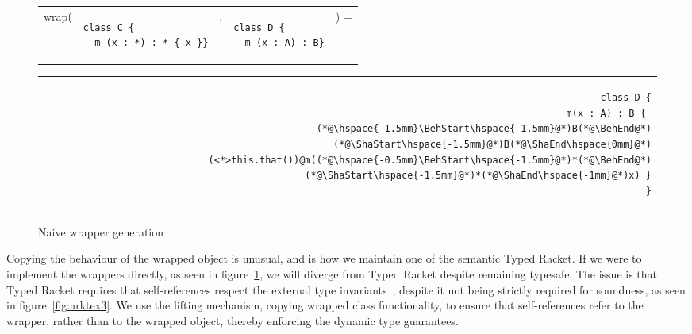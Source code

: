 \documentclass[a4paper,USenglish]{tex/lipics-v2016}
\begin{document}
\begin{figure}[!ht]
\begin{tabular}{ER{4.5cm}ER{3.5cm}E}
wrap( & 
\begin{lstlisting}
class C { 
  m (x : *) : * { x }}
\end{lstlisting}& , &
\begin{lstlisting}
class D { 
  m (x : A) : B}
\end{lstlisting}&) =
\end{tabular}
\begin{tabular}{@{}l@{}r@{}}
\hspace{4cm} \,&
\begin{minipage}{\textwidth-4cm}
\begin{lstlisting}
class D {
  m(x : A) : B { 
    (*@\hspace{-1.5mm}\BehStart\hspace{-1.5mm}@*)B(*@\BehEnd@*)(*@\ShaStart\hspace{-1.5mm}@*)B(*@\ShaEnd\hspace{0mm}@*)(<*>this.that())@m((*@\hspace{-0.5mm}\BehStart\hspace{-1.5mm}@*)*(*@\BehEnd@*)(*@\ShaStart\hspace{-1.5mm}@*)*(*@\ShaEnd\hspace{-1mm}@*)x) }
}
\end{lstlisting}
\end{minipage}
\end{tabular}
\caption{Naive wrapper generation}
\label{fig:rktex2}
\end{figure}

Copying the behaviour of the wrapped object is unusual, and is how we
maintain one of the semantic Typed Racket. If we were to implement the
wrappers directly, as seen in figure~\ref{fig:rktex2}, we will diverge from
Typed Racket despite remaining typesafe. The issue is that Typed Racket
requires that self-references respect the external type
invariants~\cite{Takikawa:2012}, despite it not being strictly required for
soundness, as seen in figure~\ref{fig:arktex3}. We use the lifting
mechanism, copying wrapped class functionality, to ensure that
self-references refer to the wrapper, rather than to the wrapped object,
thereby enforcing the dynamic type guarantees.
\end{document}
